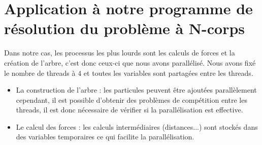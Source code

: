 \section{Application à notre programme de résolution du problème à N-corps}

Dans notre cas, les processus les plus lourds sont les calculs de forces et la création de l'arbre, c'est donc ceux-ci que nous avons parallélisé. Nous avons fixé le nombre de threads à $4$ et toutes les variables sont partagées entre les threads.

\begin{itemize}
\item La construction de l'arbre : les particules peuvent être ajoutées parallèlement cependant, il est possible d'obtenir des problèmes de compétition entre les threads, il est donc nécessaire de vérifier si la parallélisation est effective.

\item Le calcul des forces : les calculs intermédiaires (distances...) sont stockés dans des variables temporaires ce qui facilite la parallélisation.
\end{itemize}

